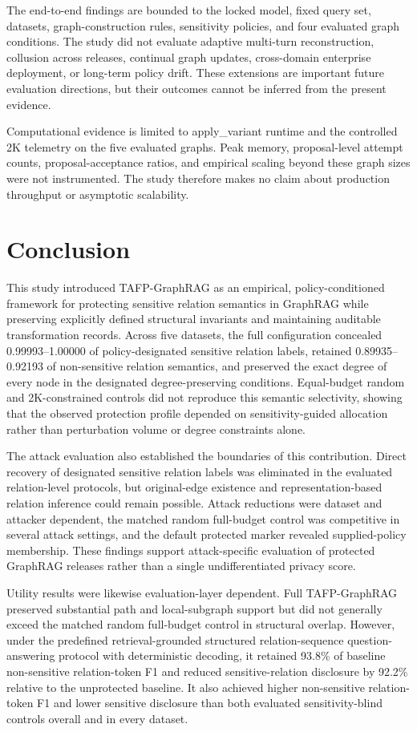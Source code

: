 \documentclass[preprint,12pt]{elsarticle}
\begin{document}
The end-to-end findings are bounded to the locked model, fixed query set, datasets, graph-construction rules, sensitivity policies, and four evaluated graph conditions. The study did not evaluate adaptive multi-turn reconstruction, collusion across releases, continual graph updates, cross-domain enterprise deployment, or long-term policy drift. These extensions are important future evaluation directions, but their outcomes cannot be inferred from the present evidence.

Computational evidence is limited to apply\_variant runtime and the controlled 2K telemetry on the five evaluated graphs. Peak memory, proposal-level attempt counts, proposal-acceptance ratios, and empirical scaling beyond these graph sizes were not instrumented. The study therefore makes no claim about production throughput or asymptotic scalability.

\section{Conclusion}
This study introduced TAFP-GraphRAG as an empirical, policy-conditioned framework for protecting sensitive relation semantics in GraphRAG while preserving explicitly defined structural invariants and maintaining auditable transformation records. Across five datasets, the full configuration concealed 0.99993--1.00000 of policy-designated sensitive relation labels, retained 0.89935--0.92193 of non-sensitive relation semantics, and preserved the exact degree of every node in the designated degree-preserving conditions. Equal-budget random and 2K-constrained controls did not reproduce this semantic selectivity, showing that the observed protection profile depended on sensitivity-guided allocation rather than perturbation volume or degree constraints alone.

The attack evaluation also established the boundaries of this contribution. Direct recovery of designated sensitive relation labels was eliminated in the evaluated relation-level protocols, but original-edge existence and representation-based relation inference could remain possible. Attack reductions were dataset and attacker dependent, the matched random full-budget control was competitive in several attack settings, and the default protected marker revealed supplied-policy membership. These findings support attack-specific evaluation of protected GraphRAG releases rather than a single undifferentiated privacy score.

Utility results were likewise evaluation-layer dependent. Full TAFP-GraphRAG preserved substantial path and local-subgraph support but did not generally exceed the matched random full-budget control in structural overlap. However, under the predefined retrieval-grounded structured relation-sequence question-answering protocol with deterministic decoding, it retained 93.8\% of baseline non-sensitive relation-token F1 and reduced sensitive-relation disclosure by 92.2\% relative to the unprotected baseline. It also achieved higher non-sensitive relation-token F1 and lower sensitive disclosure than both evaluated sensitivity-blind controls overall and in every dataset.
\end{document}

